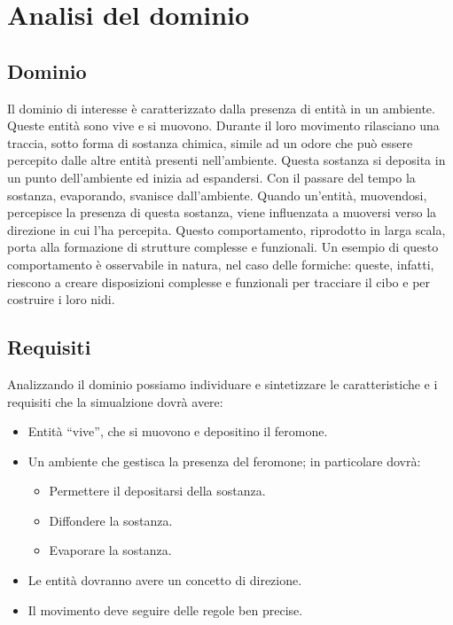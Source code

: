 \chapter{Analisi del dominio}
\section{Dominio}
Il dominio di interesse è caratterizzato dalla presenza di entità in un ambiente.
Queste entità sono vive e si muovono. Durante il loro movimento rilasciano una traccia,
sotto forma di sostanza chimica,
simile ad un odore che può essere percepito dalle altre entità presenti nell'ambiente. Questa sostanza
si deposita in un punto dell'ambiente ed inizia ad espandersi. Con il passare del tempo la sostanza, evaporando, svanisce dall'ambiente.
Quando un'entità, muovendosi, percepisce la presenza di questa sostanza, viene influenzata a muoversi verso la direzione 
in cui l'ha percepita. Questo comportamento, riprodotto in larga scala, porta alla formazione di strutture complesse e funzionali.
Un esempio di questo comportamento è osservabile in natura, nel caso delle formiche: queste, infatti, riescono a 
creare disposizioni complesse e funzionali per tracciare il cibo e per costruire i loro nidi.
\section{Requisiti}
Analizzando il dominio possiamo individuare e sintetizzare
le caratteristiche e i requisiti che la simualzione dovrà avere:
\begin{itemize}
    \item Entità ``vive'', che si muovono e depositino il feromone.
    \item Un ambiente che gestisca la presenza del feromone; in particolare dovrà:
    \begin{itemize}
        \item Permettere il depositarsi della sostanza.
        \item Diffondere la sostanza.
        \item Evaporare la sostanza.
    \end{itemize}
    \item Le entità dovranno avere un concetto di direzione.
    \item Il movimento deve seguire delle regole ben precise.
\end{itemize}

